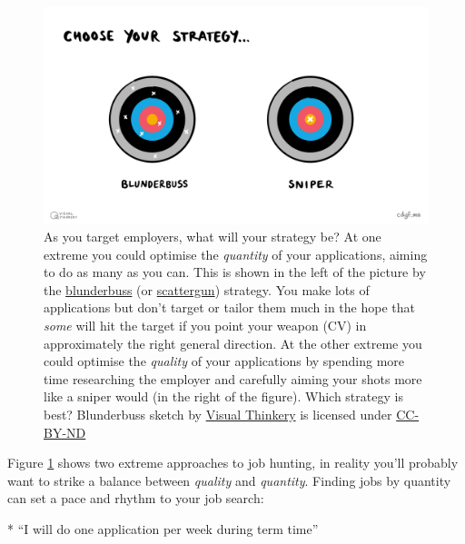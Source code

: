 \documentclass[
]{book}
\newenvironment{Shaded}{\begin{snugshade}}{\end{snugshade}}
\newcommand{\NormalTok}[1]{#1}
\newcommand{\SpecialStringTok}[1]{\textcolor[rgb]{0.31,0.60,0.02}{#1}}
\begin{document}
\begin{figure}

{\centering \includegraphics[width=1\linewidth]{images/Blunderbuss} 

}

\caption{As you target employers, what will your strategy be? At one extreme you could optimise the \emph{quantity} of your applications, aiming to do as many as you can. This is shown in the left of the picture by the \href{https://en.wikipedia.org/wiki/Blunderbuss}{blunderbuss} (or \href{https://en.wikipedia.org/wiki/Shotgun}{scattergun}) strategy. You make lots of applications but don't target or tailor them much in the hope that \emph{some} will hit the target if you point your weapon (CV) in approximately the right general direction. At the other extreme you could optimise the \emph{quality} of your applications by spending more time researching the employer and carefully aiming your shots more like a sniper would (in the right of the figure). Which strategy is best? Blunderbuss sketch by \href{https://visualthinkery.com/}{Visual Thinkery} is licensed under \href{https://creativecommons.org/licenses/by-nd/4.0/}{CC-BY-ND}}\label{fig:blunderbuss-fig}
\end{figure}



Figure \ref{fig:blunderbuss-fig} shows two extreme approaches to job hunting, in reality you'll probably want to strike a balance between \emph{quality} and \emph{quantity}. Finding jobs by quantity can set a pace and rhythm to your job search:

\begin{Shaded}
\begin{Highlighting}[]
\SpecialStringTok{* }\NormalTok{“I will do one application per week during term time”}
\end{Highlighting}
\end{Shaded}
\end{document}

